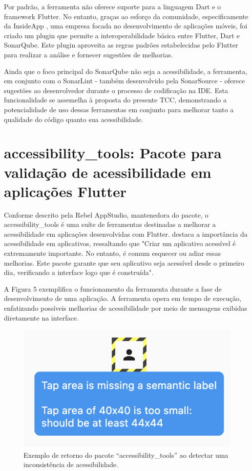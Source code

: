 Por padrão, a ferramenta não oferece suporte para a linguagem Dart e o framework Flutter. No entanto, graças ao esforço da comunidade, especificamente da InsideApp \cite{sonarflutter}, uma empresa focada no desenvolvimento de aplicações móveis, foi criado um plugin que permite a interoperabilidade básica entre Flutter, Dart e SonarQube. Este plugin aproveita as regras padrões estabelecidas pelo Flutter para realizar a análise e fornecer sugestões de melhorias.

Ainda que o foco principal do SonarQube não seja a acessibilidade, a ferramenta, em conjunto com o SonarLint - também desenvolvido pela SonarSource \cite{sonarqube} - oferece sugestões ao desenvolvedor durante o processo de codificação na IDE. Esta funcionalidade se assemelha à proposta do presente TCC, demonstrando a potencialidade de uso dessas ferramentas em conjunto para melhorar tanto a qualidade do código quanto sua acessibilidade.

\section{accessibility\_tools: Pacote para validação de acessibilidade em aplicações Flutter}

Conforme descrito pela Rebel AppStudio, mantenedora do pacote, o accessibility\_tools é uma suíte de ferramentas destinadas a melhorar a acessibilidade em aplicações desenvolvidas com Flutter. \cite{accessibilitytools} destaca a importância da acessibilidade em aplicativos, ressaltando que "Criar um aplicativo acessível é extremamente importante. No entanto, é comum esquecer ou adiar essas melhorias. Este pacote garante que seu aplicativo seja acessível desde o primeiro dia, verificando a interface logo que é construída".

A Figura 5 exemplifica o funcionamento da ferramenta durante a fase de desenvolvimento de uma aplicação. A ferramenta opera em tempo de execução, enfatizando possíveis melhorias de acessibilidade por meio de mensagens exibidas diretamente na interface.

\begin{figure}[!h]
	\centering
	\caption{Exemplo de retorno do pacote “accessibility\_tools” ao detectar uma inconsistência de acessibilidade.}
	\includegraphics[width=384pt]{Assets/AccessibilityTools.png}
\end{figure}

